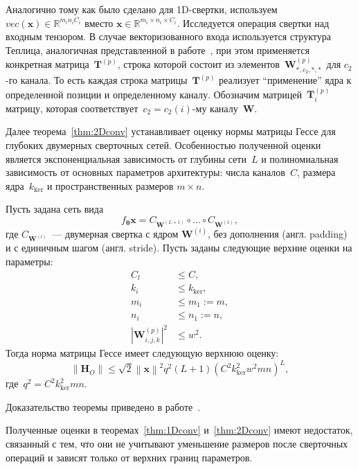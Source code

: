 Аналогично тому как было сделано для 1D-свертки, используем~$vec(\mathbf{x}) \in \mathbb{R}^{m_in_iC_i}$ вместо $\mathbf{x} \in \mathbb{R}^{m_i \times n_i \times C_i}$.
Исследуется операция свертки над входным тензором. В случае векторизованного входа используется структура Теплица, аналогичная представленной в работе~\cite{toep_2dconv}, при этом применяется конкретная матрица~$\mathbf{T}^{(p)}$, строка которой состоит из элементов~$\mathbf{W}^{(p)}_{*, c_2, *, *}$~для $c_2$-го канала.
То есть каждая строка матрицы~$\mathbf{T}^{(p)}$ реализует ``применение'' ядра к определенной позиции и определенному каналу.
Обозначим матрицей~$\mathbf{T}^{(p)}_i$ матрицу, которая соответствует~$c_2 = c_2(i)$-му каналу~$\mathbf{W}$.

Далее теорема~\ref{thm:2Dconv} устанавливает оценку нормы матрицы Гессе для глубоких двумерных сверточных сетей.
Особенностью полученной оценки является экспоненциальная зависимость от глубины сети~$L$ и полиномиальная зависимость от основных параметров архитектуры: числа каналов~$C$, размера ядра~$k_{\mathrm{ker}}$ и пространственных размеров $m \times n$.

\begin{theorem}\label{thm:2Dconv}
    Пусть задана сеть вида
    \[
        f_{\boldsymbol{\theta}}\mathbf{x} = C_{\mathbf{W}^{(L+1)}} \circ \dots \circ C_{\mathbf{W}^{(1)}},
    \]
    где $C_{\mathbf{W}^{(l)}}$~--- двумерная свертка с ядром $\mathbf{W}^{(i)}$, без дополнения (англ. padding) и с единичным шагом (англ. stride). Пусть заданы следующие верхние оценки на параметры:
    \begin{align}
        C_l &\leqslant C,\\
        k_i &\leqslant k_{\mathrm{ker}},\\
        m_i &\leqslant m_1:=m, \\
        n_i &\leqslant n_1:=n,\\
        |\mathbf{W}^{(p)}_{i,j,k}|^2 &\leqslant w^2.
    \end{align}
    Тогда норма матрицы Гессе имеет следующую верхнюю оценку:
    \[
        \left\|\mathbf{H}_{O}\right\| \leqslant \sqrt{2}\left\|\mathbf{x}\right\|^2q^2(L+1)(C^2k_{\mathrm{ker}}^2w^2mn)^{L},
    \] 
    где~$q^2 = C^2k_{\mathrm{ker}}^2mn$.
\end{theorem}
Доказательство теоремы приведено в работе~\cite{grabovoi2024convnets743111032}.

\begin{remark}
    Полученные оценки в теоремах~\ref{thm:1Dconv} и~\ref{thm:2Dconv} имеют недостаток, связанный с тем, что они не учитывают уменьшение размеров после сверточных операций и зависят только от верхних границ параметров.
\end{remark}


